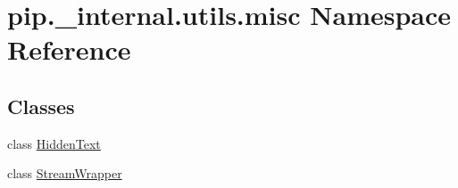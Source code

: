 \hypertarget{namespacepip_1_1__internal_1_1utils_1_1misc}{}\section{pip.\+\_\+internal.\+utils.\+misc Namespace Reference}
\label{namespacepip_1_1__internal_1_1utils_1_1misc}
\subsection*{Classes}
\begin{DoxyCompactItemize}
\item 
class \hyperlink{classpip_1_1__internal_1_1utils_1_1misc_1_1HiddenText}{Hidden\+Text}
\item 
class \hyperlink{classpip_1_1__internal_1_1utils_1_1misc_1_1StreamWrapper}{Stream\+Wrapper}
\end{DoxyCompactItemize}
